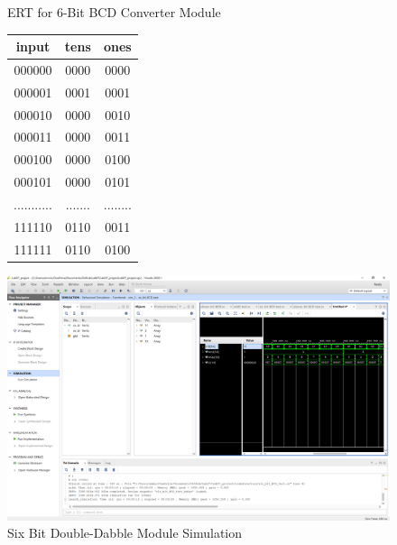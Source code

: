 \documentclass[11pt]{article}
\begin{document}
\begin{figure}[ht]\centering
	\caption{ERT for 6-Bit BCD Converter Module}
		\label{tbl:example_table}
		\begin{tabular}{c|cc}
			\toprule
			input & tens & ones \\
			\midrule
			000000 & 0000 & 0000 \\
			000001 & 0001 & 0001 \\
			000010 & 0000 & 0010 \\
			000011 & 0000 & 0011 \\
			000100 & 0000 & 0100 \\
			000101 & 0000 & 0101 \\
			........... & ....... & ........ \\
			111110 & 0110 & 0011 \\
			111111 & 0110 & 0100 \\
			\bottomrule
		\end{tabular} 
	\includegraphics[width=1\textwidth,trim=19cm 15cm 0.5cm 4.5cm,clip]{six_BCD_test_screenshot}
	\caption{Six Bit Double-Dabble Module Simulation}
	\label{fig:sim_with_table}
\end{figure}
\end{document}
